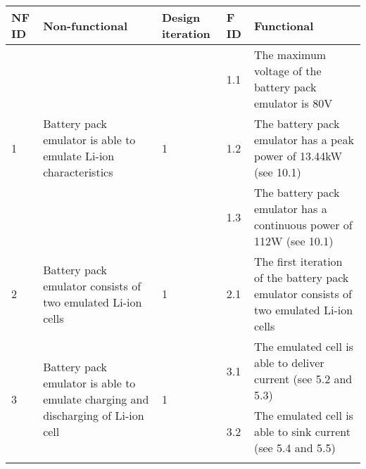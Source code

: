 \begin{longtable}{|l|p{2in}|p{0.8in}|l|p{2in}|}
    \hline
    NF ID               & Non-functional                                                                                                                        & Design iteration            & F ID & Functional                                                                                                \\ \hline
    \multirow{3}{*}{1}  & \multirow{3}{*}{Battery pack emulator is able to emulate Li-ion characteristics}                                                      & \multirow{3}{*}{1}          & 1.1  & The maximum voltage of the battery pack emulator is 80V                                                   \\ \cline{4-5} 
                        &                                                                                                                                       &                             & 1.2  & The battery pack emulator has a peak power of 13.44kW (see 10.1)                                          \\ \cline{4-5} 
                        &                                                                                                                                       &                             & 1.3  & The battery pack emulator has a continuous power of 112W (see 10.1)                                       \\ \hline
    2                   & Battery pack emulator consists of two emulated Li-ion cells                                                                           & 1                           & 2.1  & The first iteration of the battery pack emulator consists of two  emulated Li-ion cells                   \\ \hline
    \multirow{3}{*}{3}  & \multirow{3}{*}{Battery pack emulator is able to emulate charging and discharging of Li-ion cell}                                     & \multirow{3}{*}{1}          & 3.1  & The emulated cell is able to deliver current (see 5.2 and 5.3)                                            \\ \cline{4-5} 
                        &                                                                                                                                       &                             & 3.2  & The emulated cell is able to sink current (see 5.4 and 5.5)                                               \\ \cline{4-5} 

\end{longtable}
